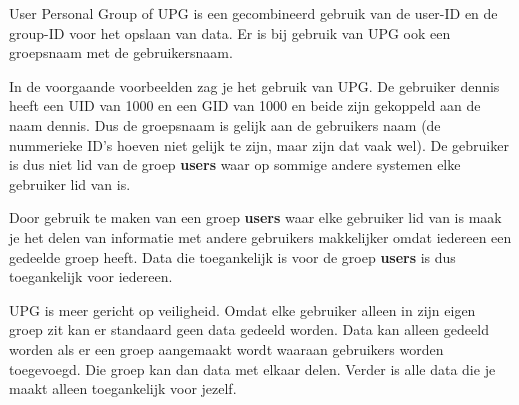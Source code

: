 User Personal Group of UPG is een gecombineerd gebruik van de user-ID en de group-ID voor het opslaan van data. Er is bij gebruik van UPG ook een groepsnaam met de gebruikersnaam.

In de voorgaande voorbeelden zag je het gebruik van UPG. De gebruiker dennis heeft een UID van 1000 en een GID van 1000 en beide zijn gekoppeld aan de naam dennis. Dus de groepsnaam is gelijk aan de gebruikers naam (de nummerieke ID's hoeven niet gelijk te zijn, maar zijn dat vaak wel). De gebruiker is dus niet lid van de groep \textbf{users} waar op sommige andere systemen elke gebruiker lid van is.

Door gebruik te maken van een groep \textbf{users} waar elke gebruiker lid van is maak je het delen van informatie met andere gebruikers makkelijker omdat iedereen een gedeelde groep heeft. Data die toegankelijk is voor de groep \textbf{users} is dus toegankelijk voor iedereen.

UPG is meer gericht op veiligheid. Omdat elke gebruiker alleen in zijn eigen groep zit kan er standaard geen data gedeeld worden. Data kan alleen gedeeld worden als er een groep aangemaakt wordt waaraan gebruikers worden toegevoegd. Die groep kan dan data met elkaar delen. Verder is alle data die je maakt alleen toegankelijk voor jezelf.
